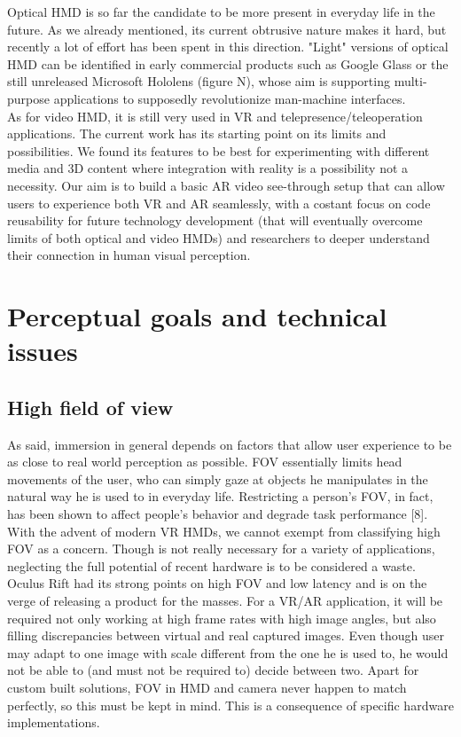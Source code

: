 Optical HMD is so far the candidate to be more present in everyday life in the future. As we already mentioned, its current obtrusive nature makes it hard, but recently a lot of effort has been spent in this direction. "Light" versions of optical HMD can be identified in early commercial products such as Google Glass or the still unreleased Microsoft Hololens (figure N), whose aim is supporting multi-purpose applications to supposedly revolutionize man-machine interfaces.\\
As for video HMD, it is still very used in VR and telepresence/teleoperation applications. The current work has its starting point on its limits and possibilities. We found its features to be best for experimenting with different media and 3D content where integration with reality is a possibility not a necessity. Our aim is to build a basic AR video see-through setup that can allow users to experience both VR and AR seamlessly, with a costant focus on code reusability for future technology development (that will eventually overcome limits of both optical and video HMDs) and researchers to deeper understand their connection in human visual perception.

\section{Perceptual goals and technical issues}
\subsection{High field of view}
As said, immersion in general depends on factors that allow user experience to be as close to real world perception as possible. FOV essentially limits head movements of the user, who can simply gaze at objects he manipulates in the natural way he is used to in everyday life. Restricting a person’s FOV, in fact, has been shown to affect people’s behavior and degrade task performance [8]. With the advent of modern VR HMDs, we cannot exempt from classifying high FOV as a concern. Though is not really necessary for a variety of applications, neglecting the full potential of recent hardware is to be considered a waste. Oculus Rift had its strong points on high FOV and low latency and is on the verge of releasing a product for the masses. For a VR/AR application, it will be required not only working at high frame rates with high image angles, but also filling discrepancies between virtual and real captured images. Even though user may adapt to one image with scale different from the one he is used to, he would not be able to (and must not be required to) decide between two. Apart for custom built solutions, FOV in HMD and camera never happen to match perfectly, so this must be kept in mind. This is a consequence of specific hardware implementations.

